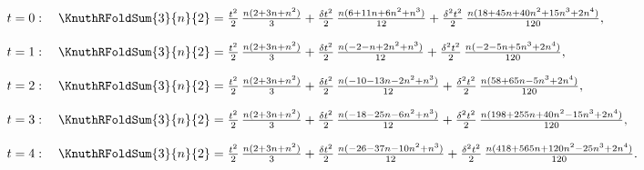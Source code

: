 \begin{example}
  \begin{align*}
    t=0:\quad
    \KnuthRFoldSum{3}{n}{2}
    &=
    \tfrac{t^2}{2}\,\tfrac{n(2+3n+n^2)}{3}
    +
    \tfrac{\delta t^2}{2}\,\tfrac{n(6+11n+6n^2+n^3)}{12}
    +
    \tfrac{\delta^2 t^2}{2}\,\tfrac{n(18+45n+40n^2+15n^3+2n^4)}{120},
    \\[8pt]
    t=1:\quad
    \KnuthRFoldSum{3}{n}{2}
    &=
    \tfrac{t^2}{2}\,\tfrac{n(2+3n+n^2)}{3}
    +
    \tfrac{\delta t^2}{2}\,\tfrac{n(-2-n+2n^2+n^3)}{12}
    +
    \tfrac{\delta^2 t^2}{2}\,\tfrac{n(-2-5n+5n^3+2n^4)}{120},
    \\[8pt]
    t=2:\quad
    \KnuthRFoldSum{3}{n}{2}
    &=
    \tfrac{t^2}{2}\,\tfrac{n(2+3n+n^2)}{3}
    +
    \tfrac{\delta t^2}{2}\,\tfrac{n(-10-13n-2n^2+n^3)}{12}
    +
    \tfrac{\delta^2 t^2}{2}\,\tfrac{n(58+65n-5n^3+2n^4)}{120},
    \\[8pt]
    t=3:\quad
    \KnuthRFoldSum{3}{n}{2}
    &=
    \tfrac{t^2}{2}\,\tfrac{n(2+3n+n^2)}{3}
    +
    \tfrac{\delta t^2}{2}\,\tfrac{n(-18-25n-6n^2+n^3)}{12}
    +
    \tfrac{\delta^2 t^2}{2}\,\tfrac{n(198+255n+40n^2-15n^3+2n^4)}{120},
    \\[8pt]
    t=4:\quad
    \KnuthRFoldSum{3}{n}{2}
    &=
    \tfrac{t^2}{2}\,\tfrac{n(2+3n+n^2)}{3}
    +
    \tfrac{\delta t^2}{2}\,\tfrac{n(-26-37n-10n^2+n^3)}{12}
    +
    \tfrac{\delta^2 t^2}{2}\,\tfrac{n(418+565n+120n^2-25n^3+2n^4)}{120}.
  \end{align*}
\end{example}

